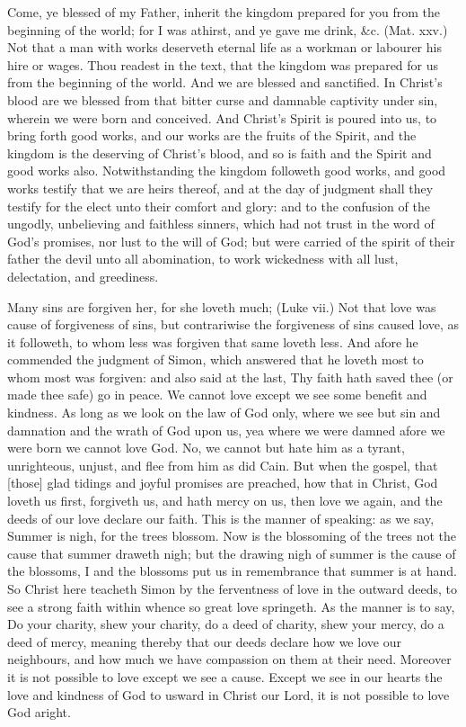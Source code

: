 Come, ye blessed of my Father, inherit the kingdom 
prepared for you from the beginning of the world; for I 
was athirst, and ye gave me drink, \&c. (Mat. xxv.) Not
that a man with works deserveth eternal life as a workman 
or labourer his hire or wages. Thou readest in the text, 
that the kingdom was prepared for us from the beginning of 
the world. And we are blessed and sanctified. In Christ's 
blood are we blessed from that bitter curse and damnable 
captivity under sin, wherein we were born and conceived. 
And Christ's Spirit is poured into us, to bring forth good 
works, and our works are the fruits of the Spirit, and the 
kingdom is the deserving of Christ's blood, and so is faith 
and the Spirit and good works also. Notwithstanding the 
kingdom followeth good works, and good works testify that 
we are heirs thereof, and at the day of judgment shall they 
testify for the elect unto their comfort and glory: and to 
the confusion of the ungodly, unbelieving and faithless 
sinners, which had not trust in the word of God's promises,
nor lust to the will of God; but were carried of 
the spirit of their father the devil unto all abomination, to 
work wickedness with all lust, delectation, and greediness. 

Many sins are forgiven her, for she loveth much; 
(Luke vii.) Not that love was cause of forgiveness of sins,
but contrariwise the forgiveness of sins caused love, as it 
followeth, to whom less was forgiven that same loveth less. 
And afore he commended the judgment of Simon, which 
answered that he loveth most to whom most was forgiven: 
and also said at the last, Thy faith hath saved thee (or 
made thee safe) go in peace. We cannot love except we 
see some benefit and kindness. As long as we look on
the law of God only, where we see but sin and damnation
and the wrath of God upon us, yea where we were damned 
afore we were born we cannot love God. No, we cannot 
but hate him as a tyrant, unrighteous, unjust, and 
flee from him as did Cain. But when the gospel, that [those] 
glad tidings and joyful promises are preached, how that in 
Christ, God loveth us first, forgiveth us, and hath mercy on 
us, then love we again, and the deeds of our love declare 
our faith. This is the manner of speaking: as we say, 
Summer is nigh, for the trees blossom. Now is the blossoming
of the trees not the cause that summer draweth 
nigh; but the drawing nigh of summer is the cause of 
the blossoms, I and the blossoms put us in remembrance 
that summer is at hand. So Christ here teacheth Simon 
by the ferventness of love in the outward deeds, to see a 
strong faith within whence so great love springeth. As 
the manner is to say, Do your charity, shew your charity, 
do a deed of charity, shew your mercy, do a deed of mercy, 
meaning thereby that our deeds declare how we love our 
neighbours, and how much we have compassion on them 
at their need. Moreover it is not possible to love except 
we see a cause. Except we see in our hearts the love and 
kindness of God to usward in Christ our Lord, it is not 
possible to love God aright. 

